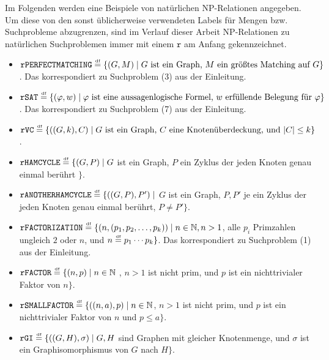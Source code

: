 Im Folgenden werden eine Beispiele von natürlichen NP-Relationen angegeben. Um diese von den sonst üblicherweise verwendeten Labels für Mengen bzw. Suchprobleme abzugrenzen, sind im Verlauf dieser Arbeit NP-Relationen zu natürlichen Suchproblemen immer mit einem $\mathtt{r}$ am Anfang gekennzeichnet.
\begin{itemize}[midpenalty=0]
\item $\mathtt{rPERFECTMATCHING} \stackrel{\text{\smash{\tiny df}}}{=} \{ (G, M) \mid \text{$G$ ist ein Graph, $M$ ein größtes Matching auf $G$} \}$. Das korrespondiert zu Suchproblem (3) aus der Einleitung.
\item $\mathtt{rSAT} \stackrel{\text{\smash{\tiny df}}}{=} \{ (\varphi, w) \mid \text{$\varphi$ ist eine aussagenlogische Formel, $w$ erfüllende Belegung für $\varphi$} \}$. Das korrespondiert zu Suchproblem (7) aus der Einleitung.
\item $\mathtt{rVC} \stackrel{\text{\smash{\tiny df}}}{=} \{ ((G, k), C) \mid \text{$G$ ist ein Graph, $C$ eine Knotenüberdeckung, und $|C|\leq k$} \}$.
\item $\mathtt{rHAMCYCLE} \stackrel{\text{\smash{\tiny df}}}{=} \{ (G, P) \mid G$ ist ein Graph, $P$ ein Zyklus der jeden Knoten genau einmal berührt $\}$.
\item $\mathtt{rANOTHERHAMCYCLE} \stackrel{\text{\smash{\tiny df}}}{=} \{ ((G, P), P') \mid $ $G$ ist ein Graph, $P, P'$ je ein Zyklus der jeden Knoten genau einmal berührt, $P\neq P' \}$.
\item $\mathtt{rFACTORIZATION} \stackrel{\text{\smash{\tiny df}}}{=} \{ (n, (p_1,p_2,\dots, p_k)) \mid n\in\mathbb N, n>1$, alle $p_i$ Primzahlen ungleich $2$ oder $n$, und $n\stackrel{\text{\smash{\tiny df}}}{=} p_1\cdots p_k \}$. Das korrespondiert zu Suchproblem (1) aus der Einleitung.
\item $\mathtt{rFACTOR} \stackrel{\text{\smash{\tiny df}}}{=} \{ (n, p) \mid n\in\mathbb N$ , $n>1$ ist nicht prim, und $p$ ist ein nichttrivialer Faktor von $n\}$.
\item $\mathtt{rSMALLFACTOR} \stackrel{\text{\smash{\tiny df}}}{=} \{ ((n, a), p) \mid n\in\mathbb N$, $n>1$ ist nicht prim, und $p$ ist ein nichttrivialer Faktor von $n$ und $p\leq a\}$.
\item $\mathtt{rGI} \stackrel{\text{\smash{\tiny df}}}{=} \{ ((G, H), \sigma) \mid G, H$ sind Graphen mit gleicher Knotenmenge, und $\sigma$ ist ein Graphisomorphismus von $G$ nach $H\}$.
\end{itemize}

